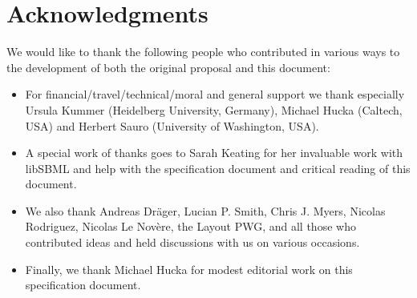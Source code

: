 \section{Acknowledgments}

We would like to thank the following people who contributed in various ways to the development of both the original proposal and this document:

\begin{itemize}

\item For financial/travel/technical/moral and general support we thank especially Ursula Kummer (Heidelberg University, Germany), Michael Hucka (Caltech, USA) and Herbert Sauro (University of Washington, USA).

\item A special work of thanks goes to Sarah Keating for her invaluable work with  \textsf{libSBML} and help with the specification document and critical reading of this document.

\item We also thank Andreas Dr\"{a}ger, Lucian P. Smith, Chris J. Myers, Nicolas Rodriguez,  Nicolas Le Nov\`{e}re, the Layout PWG, and all those who contributed ideas and held discussions with us on various occasions.

\item Finally, we thank Michael Hucka for modest editorial work on this specification document.

\end{itemize}


